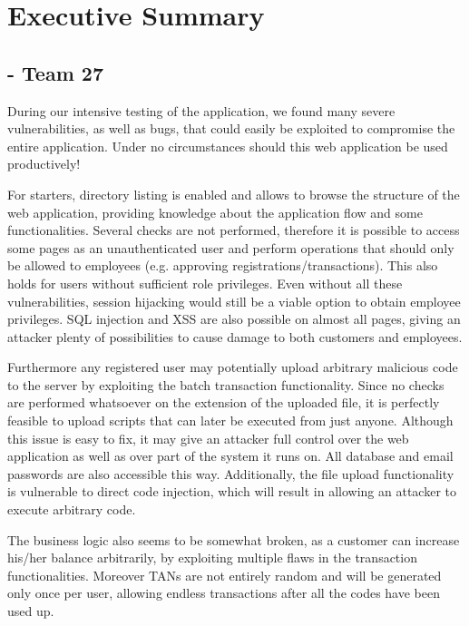 \chapter{Executive Summary}


\section{\doge - Team 27}
During our intensive testing of the \doge{} application, we found many severe vulnerabilities, as well as bugs, that could easily be exploited to compromise the entire application. Under no circumstances should this web application be used productively! \newline

For starters, directory listing is enabled and allows to browse the structure of the web application, providing knowledge about the application flow and some functionalities. Several checks are not performed, therefore it is possible to access some pages as an unauthenticated user and perform operations that should only be allowed to employees (e.g. approving registrations/transactions). This also holds for users without sufficient role privileges. Even without all these vulnerabilities, session hijacking would still be a viable option to obtain employee privileges. SQL injection and XSS are also possible on almost all pages, giving an attacker plenty of possibilities to cause damage to both customers and employees. \newline

Furthermore any registered user may potentially upload arbitrary malicious code to the server by exploiting the batch transaction functionality. Since no checks are performed whatsoever on the extension of the uploaded file, it is perfectly feasible to upload scripts that can later be executed from just anyone. Although this issue is easy to fix, it may give an attacker full control over the web application as well as over part of the system it runs on. All database and email passwords are also accessible this way. Additionally, the file upload functionality is vulnerable to direct code injection, which will result in allowing an attacker to execute arbitrary code. \newline

The business logic also seems to be somewhat broken, as a customer can increase his/her balance arbitrarily, by exploiting multiple flaws in the transaction functionalities. Moreover TANs are not entirely random and will be generated only once per user, allowing endless transactions after all the codes have been used up.

